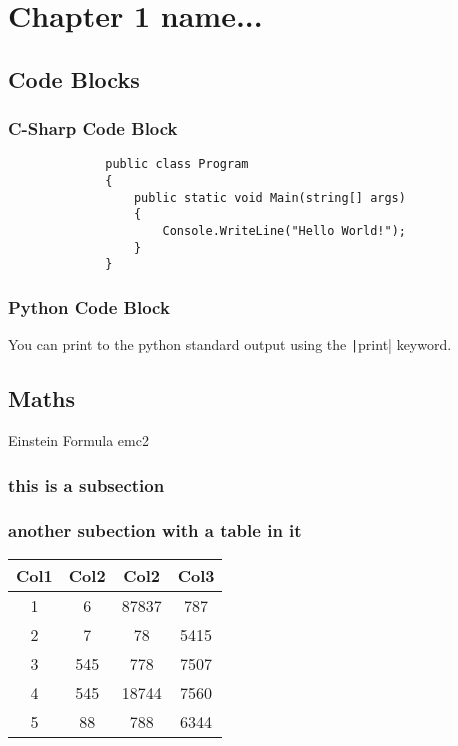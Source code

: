 \chapter{Chapter 1 name...}


\section{Code Blocks}

\subsection{C-Sharp Code Block}

\begin{figure}[ht]
    \begin{verbatim}
        public class Program
        {
            public static void Main(string[] args)
            {
                Console.WriteLine("Hello World!");
            }
        }
    \end{verbatim}
\end{figure}


\subsection{Python Code Block}

You can print to the python standard output using the \texttt|print| keyword. 

\newpage


\section{Maths}

{Einstein Formula}
{emc2}

\subsection{this is a subsection}

\lipsum[7-8]

\subsection{another subection with a table in it}


\begin{table}[h!]
\centering
\begin{tabular}{||c|c|c|c||} 
 \hline
 Col1 & Col2 & Col2 & Col3 \\ [0.5ex] 
 \hline\hline
 1 & 6 & 87837 & 787 \\ 
 2 & 7 & 78 & 5415 \\
 3 & 545 & 778 & 7507 \\
 4 & 545 & 18744 & 7560 \\
 5 & 88 & 788 & 6344 \\ [1ex] 
 \hline
\end{tabular}
\end{table}

